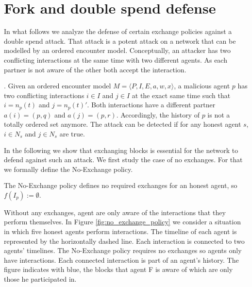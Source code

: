
\section{Fork and double spend defense}
\label{sec:model_double_spend}
In what follows we analyze the defense of certain exchange policies against a double spend attack. 
That attack is a potent attack on a network that can be modelled by an ordered encounter model. 
Conceptually, an attacker 
has two conflicting interactions at the same time with two different agents. As each partner is not
aware of the other both accept the interaction. 

\begin{defn}. Given an ordered encounter model $M = \langle P, I, E, a, w, x \rangle$, a malicious agent $p$ has two conflicting interactions 
    $i \in I$ and $j \in I$ at the exact same time such that $i = n_p(t)$ and $j = n_p(t)'$. Both interactions have a different partner $a(i) = (p, q)$ 
    and $a(j) = (p, r)$. Accordingly, the history  of $p$ is not a totally ordered set anymore.
    The attack can be detected if for any honest agent $s$, $i \in N_{s}$ and $j \in N_{s}$ are
    true.
\end{defn}

In the following we show that exchanging blocks is essential for the network to defend against such an 
attack. We first study the case of no exchanges. For that we formally define the No-Exchange policy.

\begin{pol}[No-Exchange]
    \label{pol:no-exchange}
    The No-Exchange policy defines no required exchanges for an honest agent, so $f(I_p) := \emptyset$.
\end{pol}

Without any exchanges, agent are only aware of the interactions that they perform themselves. In
Figure \ref{fig:no_exchange_policy} we consider a situation in which five honest agents perform interactions. 
The timeline of each agent is represented by the horizontally dashed line. Each interaction is 
connected to two agents' timelines. The No-Exchange policy requires no exchanges so agents only have
interactions. Each connected interaction is part of an agent's history. The figure indicates with 
blue, the blocks that agent F is aware of which are only those he participated in.


